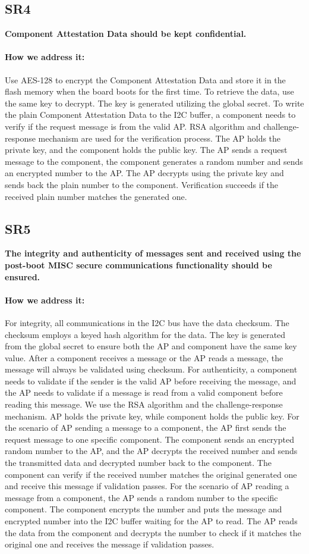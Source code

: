 \documentclass[11pt,oneside,onecolumn,letterpaper]{article}
\newcounter{alg}
\begin{document}
\subsection{SR4}
\textbf{Component Attestation Data should be kept confidential.}
\paragraph{How we address it:}
Use AES-128 to encrypt the Component Attestation Data and store it in the flash memory when the board boots for the first time.
To retrieve the data,
use the same key to decrypt.
The key is generated utilizing the global secret.
To write the plain Component Attestation Data to the I2C buffer,
a component needs to verify if the request message is from the valid AP.
RSA algorithm and challenge-response mechanism are used for the verification process.
The AP holds the private key,
and the component holds the public key.
The AP sends a request message to the component,
the component generates a random number and sends an encrypted number to the AP.
The AP decrypts using the private key and sends back the plain number to the component.
Verification succeeds if the received plain number matches the generated one.

\subsection{SR5}
\textbf{The integrity and authenticity of messages sent and received using the post-boot MISC secure communications functionality should be ensured.}
\paragraph{How we address it:}
For integrity,
all communications in the I2C bus have the data checksum.
The checksum employs a keyed hash algorithm for the data.
The key is generated from the global secret to ensure both the AP and component have the same key value.
After a component receives a message or the AP reads a message,
the message will always be validated using checksum.
For authenticity,
a component needs to validate if the sender is the valid AP before receiving the message,
and the AP needs to validate if a message is read from a valid component before reading this message.
We use the RSA algorithm and the challenge-response mechanism.
AP holds the private key,
while component holds the public key.
For the scenario of AP sending a message to a component,
the AP first sends the request message to one specific component.
The component sends an encrypted random number to the AP,
and the AP decrypts the received number and sends the transmitted data and decrypted number back to the component.
The component can verify if the received number matches the original generated one and receive this message if validation passes.
For the scenario of AP reading a message from a component,
the AP sends a random number to the specific component.
The component encrypts the number and puts the message and encrypted number into the I2C buffer waiting for the AP to read.
The AP reads the data from the component and decrypts the number to check if it matches the original one and receives the message if validation passes.
\end{document}
